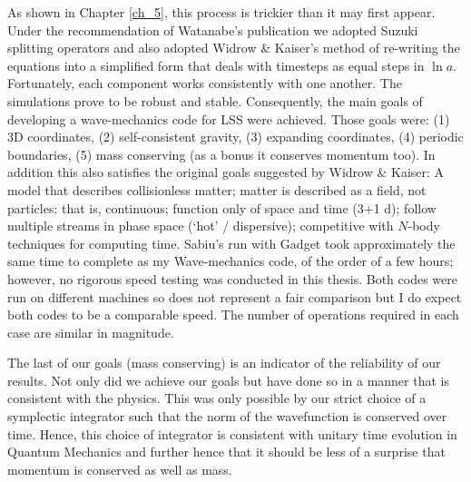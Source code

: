 As shown in Chapter \ref{ch_5}, this process is trickier than it may first appear. Under the recommendation of Watanabe's publication we adopted Suzuki splitting operators and also adopted Widrow \& Kaiser's method of re-writing the equations into a simplified form that deals with timesteps as equal steps in $\ln a$. Fortunately, each component works consistently with one another. The simulations prove to be robust and stable. Consequently, the main goals of developing a wave-mechanics code for LSS were achieved. Those goals were: (1) 3D coordinates, (2) self-consistent gravity, (3) expanding coordinates, (4) periodic boundaries, (5) mass conserving (as a bonus it conserves momentum too). In addition this also satisfies the original goals suggested by Widrow \& Kaiser: A model that describes collisionless matter; matter is described as a field, not particles: that is, continuous; function only of space and time (3+1 d); follow multiple streams in phase space (`hot' / dispersive); competitive with $N$-body techniques for computing time. Sabiu's run with Gadget took approximately the same time to complete as my Wave-mechanics code, of the order of a few hours; however, no rigorous speed testing was conducted in this thesis. Both codes were run on different machines so does not represent a fair comparison but I do expect both codes to be a comparable speed. The number of operations required in each case are similar in magnitude.

The last of our goals (mass conserving) is an indicator of the reliability of our results. Not only did we achieve our goals but have done so in a manner that is consistent with the physics. This was only possible by our strict choice of a symplectic integrator such that the norm of the wavefunction is conserved over time. Hence, this choice of integrator is consistent with unitary time evolution in Quantum Mechanics and further hence that it should be less of a surprise that momentum is conserved as well as mass.

